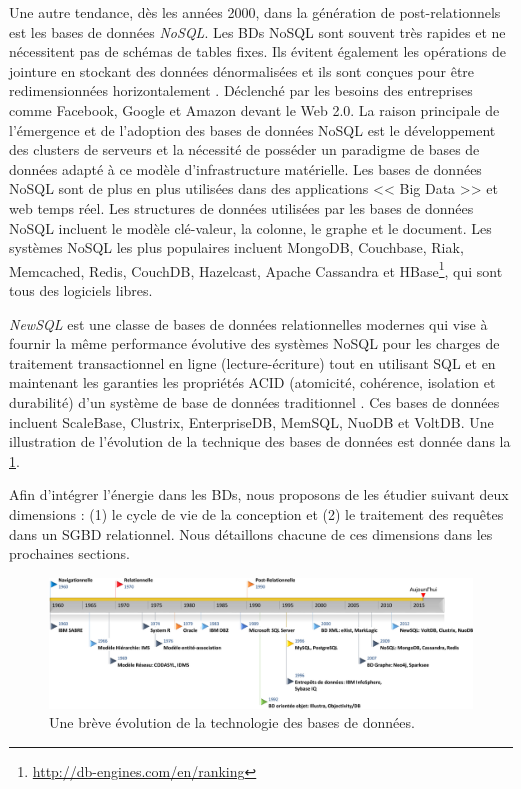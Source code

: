 Une autre tendance, dès les années 2000, dans la génération de post-relationnels est les bases de données \textit{NoSQL}. Les BDs NoSQL sont souvent très rapides et ne nécessitent pas de schémas de tables fixes. Ils évitent également les opérations de jointure en stockant des données dénormalisées et ils sont conçues pour être redimensionnées horizontalement \cite{Stonebraker10}. Déclenché par les besoins des entreprises comme Facebook, Google et Amazon devant le Web 2.0. La raison principale de l'émergence et de l'adoption des bases de données NoSQL est le développement des clusters de serveurs et la nécessité de posséder un paradigme de bases de données adapté à ce modèle d'infrastructure matérielle. Les bases de données NoSQL sont de plus en plus utilisées dans des applications << Big Data >> et web temps réel. Les structures de données utilisées par les bases de données NoSQL incluent le modèle clé-valeur, la colonne, le graphe et le document. Les systèmes NoSQL les plus populaires incluent MongoDB, Couchbase, Riak, Memcached, Redis, CouchDB, Hazelcast, Apache Cassandra et HBase\footnote{\url{http://db-engines.com/en/ranking}}, qui sont tous des logiciels libres.

\textit{NewSQL} est une classe de bases de données relationnelles modernes qui vise à fournir la même performance évolutive des systèmes NoSQL pour les charges de traitement transactionnel en ligne (lecture-écriture) tout en utilisant SQL et en maintenant les garanties les propriétés ACID (atomicité, cohérence, isolation et durabilité) d'un système de base de données traditionnel \cite{Stonebraker12}. Ces bases de données incluent ScaleBase, Clustrix, EnterpriseDB, MemSQL, NuoDB et VoltDB. Une illustration de l'évolution de la technique des bases de données est donnée dans la \ref{fig:db-timeline}.

Afin d'intégrer l'énergie dans les BDs, nous proposons de les étudier suivant deux dimensions : (1) le cycle de vie de la conception et (2) le traitement des requêtes dans un SGBD relationnel. Nous détaillons chacune de ces dimensions dans les prochaines sections.

\begin{figure}
\begin{center}
\includegraphics[scale=0.55]{chapitre2/chap2Fig/db-timeline.pdf}
\caption{Une brève évolution de la technologie des bases de données.}
 \label{fig:db-timeline}
\end{center}
\end{figure}

